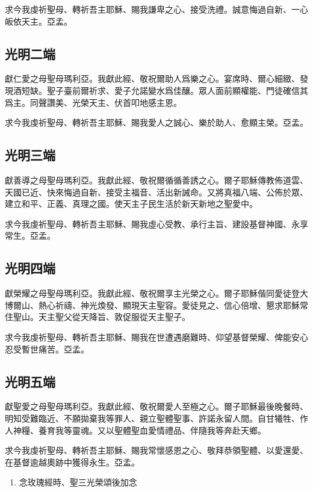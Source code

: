 求{\cspace}今我虔祈聖母、轉祈吾主耶穌、賜我謙卑之心、接受洗禮。誠意悔過自新、一心皈依天主。{\cspace}亞孟。

\subsection*{光明二端}
獻{\cspace}仁愛之母聖母瑪利亞。我獻此經、敬祝爾助人爲樂之心。宴席時、爾心細緻、發現酒短缺。聖子臺前爾祈求、愛子允諾變水爲佳釀。眾人面前顯權能、門徒確信其爲主。同聲讚美、光榮天主、伏首叩地感主恩。

求{\cspace}今我虔祈聖母、轉祈吾主耶穌、賜我愛人之誠心、樂於助人、愈顯主榮。{\cspace}亞孟。

\subsection*{光明三端}
獻{\cspace}善導之母聖母瑪利亞。我獻此經、敬祝爾循循善誘之心。爾子耶穌傳教佈道雲、天國已近、快來悔過自新、接受主福音、活出新誡命。又將真福八端、公佈於眾、建立和平、正義、真理之國。使天主子民生活於新天新地之聖愛中。

求{\cspace}今我虔祈聖母、轉祈吾主耶穌、賜我虛心受教、承行主旨、建設基督神國、永享常生。{\cspace}亞孟。

\subsection*{光明四端}
獻{\cspace}榮耀之母聖母瑪利亞。我獻此經、敬祝爾享主光榮之心。爾子耶穌偕同愛徒登大博爾山、熱心祈禱、神光煥發、顯現天主聖容。愛徒見之、信心倍增、懇求耶穌常住聖山。天主聖父從天降旨、敦促服從天主聖子。

求{\cspace}今我虔祈聖母、轉祈吾主耶穌、賜我在世遭遇磨難時、仰望基督榮耀、俾能安心忍受暫世痛苦。{\cspace}亞孟。

\subsection*{光明五端}
獻{\cspace}聖愛之母聖母瑪利亞。我獻此經、敬祝爾愛人至極之心。爾子耶穌最後晚餐時、明知受難臨近、不願拋棄我等罪人、親立聖體聖事、許諾永留人間。自甘犧牲、作人神糧、養育我等靈魂。又以聖體聖血愛情禮品、伴隨我等奔赴天鄉。

求{\cspace}今我虔祈聖母、轉祈吾主耶穌、賜我常懷感恩之心、敬拜恭領聖體、以愛還愛、在基督逾越奧跡中獲得永生。{\cspace}亞孟。

\begin{enumerate}
    \item[]{\small 念玫瑰經時、聖三光榮頌後加念}
\end{enumerate}

